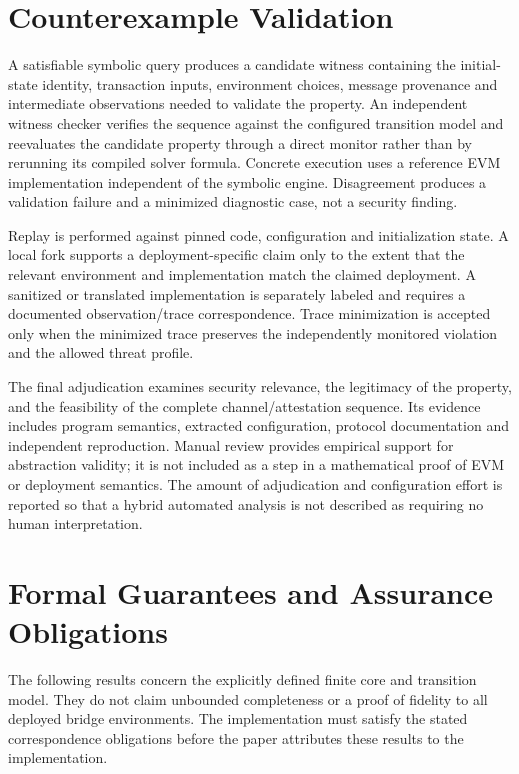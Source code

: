 \documentclass[journal]{IEEEtran}
\theoremstyle{definition}
\begin{document}
\section{Counterexample Validation}
\label{sec:validation-v2}

A satisfiable symbolic query produces a candidate witness containing the initial-state identity, transaction inputs, environment choices, message provenance and intermediate observations needed to validate the property. An independent witness checker verifies the sequence against the configured transition model and reevaluates the candidate property through a direct monitor rather than by rerunning its compiled solver formula. Concrete execution uses a reference EVM implementation independent of the symbolic engine. Disagreement produces a validation failure and a minimized diagnostic case, not a security finding.

Replay is performed against pinned code, configuration and initialization state. A local fork supports a deployment-specific claim only to the extent that the relevant environment and implementation match the claimed deployment. A sanitized or translated implementation is separately labeled and requires a documented observation/trace correspondence. Trace minimization is accepted only when the minimized trace preserves the independently monitored violation and the allowed threat profile.

The final adjudication examines security relevance, the legitimacy of the property, and the feasibility of the complete channel/attestation sequence. Its evidence includes program semantics, extracted configuration, protocol documentation and independent reproduction. Manual review provides empirical support for abstraction validity; it is not included as a step in a mathematical proof of EVM or deployment semantics. The amount of adjudication and configuration effort is reported so that a hybrid automated analysis is not described as requiring no human interpretation.

\section{Formal Guarantees and Assurance Obligations}
\label{sec:guarantees-v2}

The following results concern the explicitly defined finite core and transition model. They do not claim unbounded completeness or a proof of fidelity to all deployed bridge environments. The implementation must satisfy the stated correspondence obligations before the paper attributes these results to the implementation.
\end{document}
